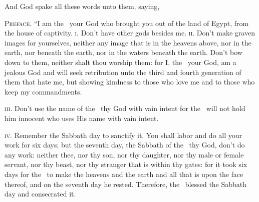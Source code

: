
\begin{inparaenum}
   And God spake all these words unto them, saying,%
  
   \textsc{Preface.} ``I am the \lord\ your God who brought you out of the land of Egypt, from the house of captivity.%
   \textsc{i.} Don't have other gods besides me.%
   \textsc{ii.} Don't make graven images for yourselves, neither any image that is in the heavens above, nor in the earth, nor beneath the earth, nor in the waters beneath the earth.%
   Don't bow down to them, neither shalt thou worship them: for I, the \lord\ your God, am a jealous God and will seek retribution unto the third and fourth generation of them that hate me,%
   but showing kindness to those who love me and to those who keep my commandments.%
  
   \textsc{iii.} Don't use the name of the \lord\ thy God with vain intent for the \lord\ will not hold him innocent who uses His name with vain intent.%
  
   \textsc{iv.} Remember the Sabbath day to sanctify it.%
   You shall labor and do all your work for six days;%
   but the seventh day, the Sabbath of the \lord\ thy God, don't do any work: neither thee, nor thy son, nor thy daughter, nor thy male or female servant, nor thy beast, nor thy stranger that is within thy gates:%
   for it took six days for the \lord\ to make the heavens and the earth and all that is upon the face thereof, and on the seventh day he rested. Therefore, the \lord\ blessed the Sabbath day and consecrated it.%
  

\end{inparaenum}
